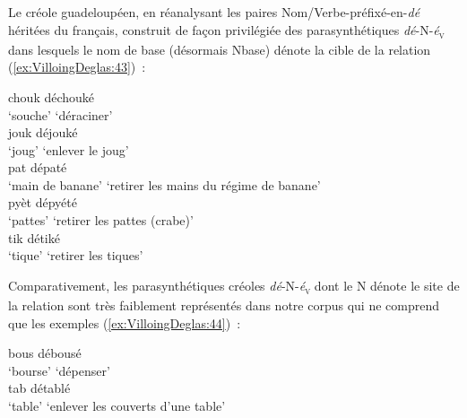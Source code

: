 \documentclass[output=paper]{langsci/langscibook}
\begin{document}
Le créole guadeloupéen, en réanalysant les paires
Nom/Verbe-préfixé-en-\emph{dé} héritées du français, construit de
façon privilégiée des parasynthétiques \emph{dé}-N-\emph{é}\textsubscript{\textsc{v}} dans
lesquels le nom de base (désormais Nbase) dénote la cible de la relation
(\ref{ex:VilloingDeglas:43})~:

\ea \label{ex:VilloingDeglas:43}
      \ea \gll chouk \textrightarrow{~} déchouké\\
        {`souche'} {} {`déraciner'}\\
      \ex \gll  jouk \textrightarrow{~} déjouké\\
        {`joug'} {} {`enlever le joug'}\\
      \ex \gll  pat \textrightarrow{~} dépaté\\
        {`main de banane'} {} {`retirer les mains du régime de banane'}\\
      \ex \gll  pyèt \textrightarrow{~} dépyété\\
        {`pattes'} {} {`retirer les pattes (crabe)'}\\
      \ex \gll  tik \textrightarrow{~} détiké\\
        {`tique'} {} {`retirer les tiques'}\\
\z\z


Comparativement, les parasynthétiques créoles \emph{dé}-N-\emph{é}\textsubscript{\textsc{v}}
dont le N dénote le site de la relation sont très faiblement représentés
dans notre corpus qui ne comprend que les exemples (\ref{ex:VilloingDeglas:44})~:

\ea \label{ex:VilloingDeglas:44}
      \ea \gll bous \textrightarrow{~} débousé\\
        {`bourse'} {} {`dépenser'}\\
      \ex \gll  tab \textrightarrow{~} détablé\\
        {`table'} {} {`enlever les couverts d'une table'}\\
\z\z
\end{document}
